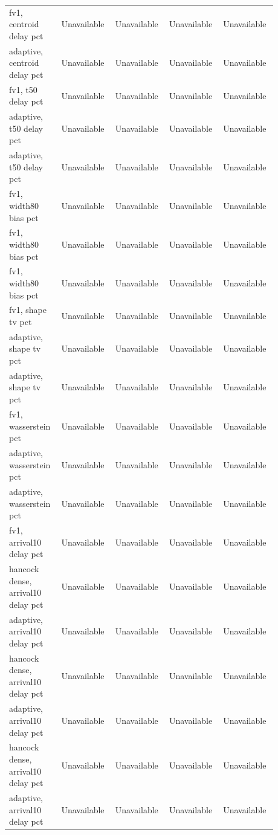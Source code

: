 \begin{longtable}{p{0.1760\linewidth}p{0.1760\linewidth}p{0.1760\linewidth}p{0.1760\linewidth}p{0.1760\linewidth}}
fv1, centroid delay pct & Unavailable & Unavailable & Unavailable & Unavailable \\
adaptive, centroid delay pct & Unavailable & Unavailable & Unavailable & Unavailable \\
fv1, t50 delay pct & Unavailable & Unavailable & Unavailable & Unavailable \\
adaptive, t50 delay pct & Unavailable & Unavailable & Unavailable & Unavailable \\
adaptive, t50 delay pct & Unavailable & Unavailable & Unavailable & Unavailable \\
fv1, width80 bias pct & Unavailable & Unavailable & Unavailable & Unavailable \\
fv1, width80 bias pct & Unavailable & Unavailable & Unavailable & Unavailable \\
fv1, width80 bias pct & Unavailable & Unavailable & Unavailable & Unavailable \\
fv1, shape tv pct & Unavailable & Unavailable & Unavailable & Unavailable \\
adaptive, shape tv pct & Unavailable & Unavailable & Unavailable & Unavailable \\
adaptive, shape tv pct & Unavailable & Unavailable & Unavailable & Unavailable \\
fv1, wasserstein pct & Unavailable & Unavailable & Unavailable & Unavailable \\
adaptive, wasserstein pct & Unavailable & Unavailable & Unavailable & Unavailable \\
adaptive, wasserstein pct & Unavailable & Unavailable & Unavailable & Unavailable \\
fv1, arrival10 delay pct & Unavailable & Unavailable & Unavailable & Unavailable \\
hancock dense, arrival10 delay pct & Unavailable & Unavailable & Unavailable & Unavailable \\
adaptive, arrival10 delay pct & Unavailable & Unavailable & Unavailable & Unavailable \\
hancock dense, arrival10 delay pct & Unavailable & Unavailable & Unavailable & Unavailable \\
adaptive, arrival10 delay pct & Unavailable & Unavailable & Unavailable & Unavailable \\
hancock dense, arrival10 delay pct & Unavailable & Unavailable & Unavailable & Unavailable \\
adaptive, arrival10 delay pct & Unavailable & Unavailable & Unavailable & Unavailable \\

\end{longtable}

